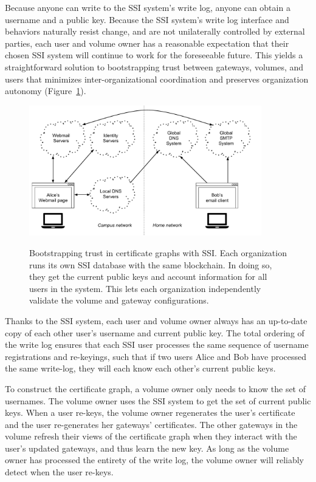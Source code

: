 Because anyone can write to the SSI system's write log, anyone can obtain a
username and a public key.  Because the SSI system's write log interface and
behaviors naturally resist change, and are not unilaterally controlled by
external parties, each user and volume owner has a reasonable
expectation that their chosen SSI system will continue to work for the
foreseeable future.  This yields a straightforward solution to bootstrapping
trust between gateways, volumes, and users that minimizes inter-organizational
coordination and preserves organization autonomy 
(Figure~\ref{fig:chap2-ssi-system-with-volumes}).

\begin{figure}[h!]
   \caption{Bootstrapping trust in certificate graphs with SSI.  Each
   organization runs its own SSI database with the same blockchain.  In doing
   so, they get the current public keys and account information for all users in
   the system.  This lets each organization independently validate the volume
   and gateway configurations.}
   \centering
   \includegraphics[width=0.9\textwidth,page=15]{figures/dissertation-figures}
   \label{fig:chap2-ssi-system-with-volumes}
\end{figure}

Thanks to the SSI system, each user and volume owner always has an up-to-date
copy of each other user's username and current public key.  The total ordering
of the write log ensures that each SSI user processes the same sequence of
username registrations and re-keyings, such that if two users Alice and Bob have
processed the same write-log, they will each know each other's current public
keys.

To construct the certificate graph, a volume owner only needs to know the set of
usernames.  The volume owner uses the SSI system to get the set of current
public keys.  When a user re-keys, the volume owner regenerates the user's
certificate and the user re-generates her gateways' certificates.  The other
gateways in the volume refresh their views of the certificate graph when they
interact with the user's updated gateways, and thus learn the new key.
As long as the volume owner has
processed the entirety of the write log, the volume owner will reliably detect
when the user re-keys.

